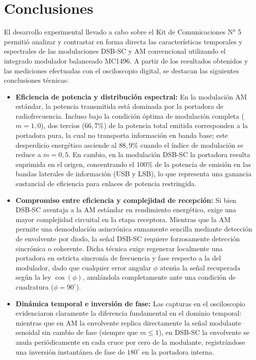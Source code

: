 \chapter{Conclusiones}
\label{sec.ej3:conclusiones}

El desarrollo experimental llevado a cabo sobre el Kit de Comunicaciones N° 5 permitió analizar y contrastar en forma
directa las características temporales y espectrales de las modulaciones DSB-SC y AM convencional utilizando el
integrado modulador balanceado MC1496. A partir de los resultados obtenidos y las mediciones efectuadas con el
osciloscopio digital, se destacan las siguientes conclusiones técnicas:

\begin{itemize}
    \item \textbf{Eficiencia de potencia y distribución espectral:} En la modulación AM estándar, la potencia
          transmitida está dominada por la portadora de radiofrecuencia. Incluso bajo la condición óptima de modulación
          completa ($m = 1{,}0$), dos tercios ($66{,}7\%$) de la potencia total emitida corresponden a la portadora
          pura, la cual no transporta información en banda base; este desperdicio energético asciende al $88{,}9\%$
          cuando el índice de modulación se reduce a $m = 0{,}5$. En cambio, en la modulación DSB-SC la portadora
          resulta suprimida en el origen, concentrando el $100\%$ de la potencia de emisión en las bandas laterales de
          información (USB y LSB), lo que representa una ganancia sustancial de eficiencia para enlaces de potencia
          restringida.
          
    \item \textbf{Compromiso entre eficiencia y complejidad de recepción:} Si bien DSB-SC aventaja a la AM estándar
          en rendimiento energético, exige una mayor complejidad circuital en la etapa receptora. Mientras que la AM
          permite una demodulación asincrónica sumamente sencilla mediante detección de envolvente por diodo, la señal
          DSB-SC requiere forzosamente detección sincrónica o coherente. Dicha técnica exige regenerar localmente una
          portadora en estricta sincronía de frecuencia y fase respecto a la del modulador, dado que cualquier error
          angular $\phi$ atenúa la señal recuperada según la ley $\cos(\phi)$, anulándola completamente ante una
          condición de cuadratura ($\phi = 90^\circ$).

    \item \textbf{Dinámica temporal e inversión de fase:} Las capturas en el osciloscopio evidenciaron claramente la
          diferencia fundamental en el dominio temporal: mientras que en AM la envolvente replica directamente la señal
          modulante senoidal sin cambio de fase (siempre que $m \le 1$), en DSB-SC la envolvente se anula periódicamente
          en cada cruce por cero de la modulante, registrándose una inversión instantánea de fase de $180^\circ$ en la
          portadora interna.


\end{itemize}
